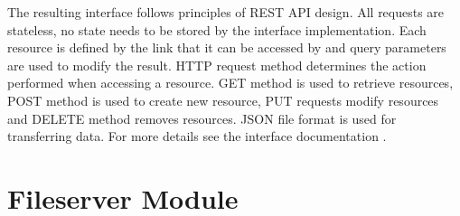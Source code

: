 \par
The resulting interface follows principles of REST API design. All requests are stateless, no state needs to be stored by the interface implementation. Each resource is defined by the link that it can be accessed by and query parameters are used to modify the result. HTTP request method determines the action performed when accessing a resource. GET method is used to retrieve resources, POST method is used to create new resource, PUT requests modify resources and DELETE method removes resources. JSON file format is used for transferring data. For more details see the interface documentation .

\section{Fileserver Module}

